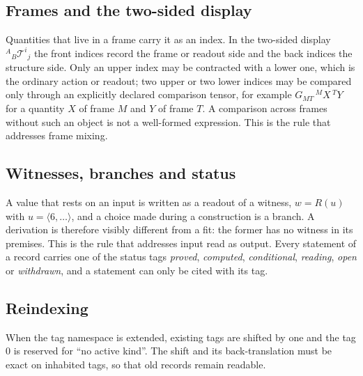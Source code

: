 \subsection{Frames and the two-sided display}

Quantities that live in a frame carry it as an index.  In the two-sided display \({}^{A}{}_{B}\mathcal T^{i}{}_{j}\) the front indices record the
frame or readout side and the back indices the structure side.  Only an upper index may be contracted with a lower one, which is the ordinary
action or readout; two upper or two lower indices may be compared only through an explicitly declared comparison tensor, for example
\(G_{MT}\,{}^{M}X\,{}^{T}Y\) for a quantity \(X\) of frame \(M\) and \(Y\) of frame \(T\).  A comparison across frames without such an object is not
a well-formed expression.  This is the rule that addresses frame mixing.

\subsection{Witnesses, branches and status}

A value that rests on an input is written as a readout of a witness, \(w=R(u)\) with \(u=\langle6,\dots\rangle\), and a choice made during a
construction is a branch.  A derivation is therefore visibly different from a fit: the former has no witness in its premises.  This is the
rule that addresses input read as output.  Every statement of a record carries one of the status tags \emph{proved}, \emph{computed},
\emph{conditional}, \emph{reading}, \emph{open} or \emph{withdrawn}, and a statement can only be cited with its tag.

\subsection{Reindexing}

When the tag namespace is extended, existing tags are shifted by one and the tag \(0\) is reserved for ``no active kind''.  The shift and its
back-translation must be exact on inhabited tags, so that old records remain readable.
